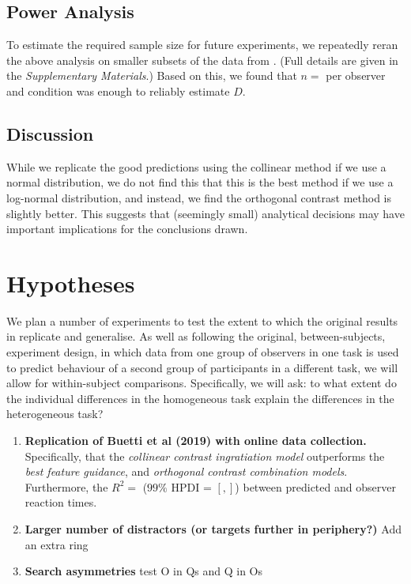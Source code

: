 \documentclass[smallextended]{svjour3}       %
\begin{document}
\subsection{Power Analysis}
\label{sec:power}

To estimate the required sample size for future experiments, we repeatedly reran the above analysis on smaller subsets of the data from \cite{buetti2019predicting}. (Full details are given in the \textit{Supplementary Materials}.) Based on this, we found that $n = $ per observer and condition was enough to reliably estimate $D$. 

\subsection{Discussion}

While we replicate the good predictions using the collinear method if we use a normal distribution, we do not find this that this is the best method if we use a log-normal distribution, and instead, we find the orthogonal contrast method is slightly better. This suggests that (seemingly small) analytical decisions may have important implications for the conclusions drawn. 

\section{Hypotheses}

We plan a number of experiments to test the extent to which the original results in \cite{buetti2019predicting} replicate and generalise. As well as following the original, between-subjects, experiment design, in which data from one group of observers in one task is used to predict behaviour of a second group of participants in a different task, we will allow for within-subject comparisons. Specifically, we will ask: to what extent do the individual differences in the homogeneous task explain the differences in the heterogeneous task? 

\begin{enumerate}
\item \textbf{Replication of Buetti et al (2019) with online data collection.} Specifically, that the \textit{collinear contrast ingratiation model} outperforms the \textit{best feature guidance}, and \textit{orthogonal contrast combination models}.  Furthermore, the $R^2 = $ ($99\%$ HPDI = $[, ]$) between predicted and observer reaction times.\\
\item \textbf{Larger number of distractors (or targets further in periphery?)} Add an extra ring \\ 
\item \textbf{Search asymmetries} test O in Qs and Q in Os \\
\end{enumerate}
\end{document}
